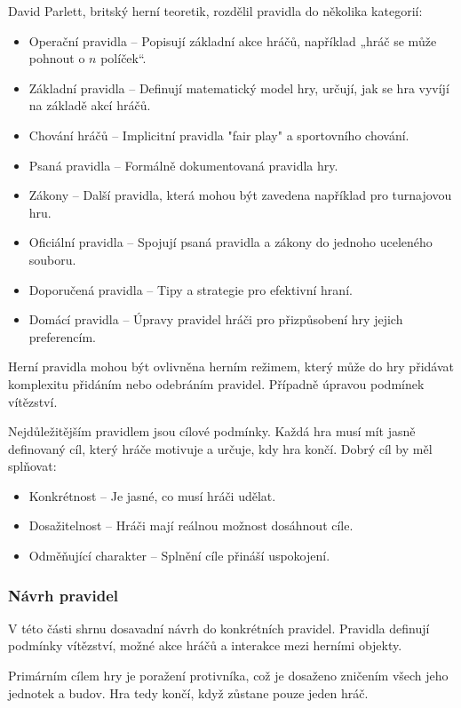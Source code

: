 David Parlett, britský herní teoretik, rozdělil pravidla do několika kategorií:

\begin{itemize}
    \item Operační pravidla -- Popisují základní akce hráčů, například „hráč se může pohnout o $n$ políček“.
    \item Základní pravidla -- Definují matematický model hry, určují, jak se hra vyvíjí na základě akcí hráčů.
    \item Chování hráčů -- Implicitní pravidla "fair play" a sportovního chování.
    \item Psaná pravidla -- Formálně dokumentovaná pravidla hry.
    \item Zákony -- Další pravidla, která mohou být zavedena například pro turnajovou hru.
    \item Oficiální pravidla -- Spojují psaná pravidla a zákony do jednoho uceleného souboru.
    \item Doporučená pravidla -- Tipy a strategie pro efektivní hraní.
    \item Domácí pravidla -- Úpravy pravidel hráči pro přizpůsobení hry jejich preferencím.
\end{itemize}

Herní pravidla mohou být ovlivněna herním režimem, který může do hry přidávat komplexitu přidáním nebo odebráním pravidel. Případně úpravou podmínek vítězství.

Nejdůležitějším pravidlem jsou cílové podmínky. Každá hra musí mít jasně definovaný cíl, který hráče motivuje a určuje, kdy hra končí. Dobrý cíl by měl splňovat:

\begin{itemize}
    \item Konkrétnost -- Je jasné, co musí hráči udělat.
    \item Dosažitelnost -- Hráči mají reálnou možnost dosáhnout cíle.
    \item Odměňující charakter -- Splnění cíle přináší uspokojení.
\end{itemize}

\subsubsection{Návrh pravidel}

V této části shrnu dosavadní návrh do konkrétních pravidel. Pravidla definují podmínky vítězství, možné akce hráčů a interakce mezi herními objekty.

Primárním cílem hry je poražení protivníka, což je dosaženo zničením všech jeho jednotek a budov. Hra tedy končí, když zůstane pouze jeden hráč.


